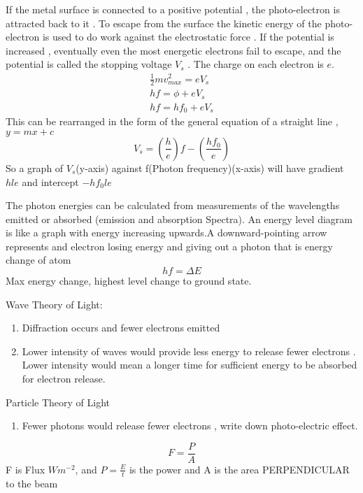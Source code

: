 \documentclass[a4paper]{article}
\begin{document}
\begin{defi}
If the metal surface is connected to a positive potential , the photo-electron is attracted back to it . To escape from the surface the kinetic energy of the photo-electron is used to do work against the electrostatic force . If the potential is increased , eventually even the most energetic electrons fail to escape, and the potential is called the stopping voltage $V_s$ . The charge on each electron is $e$.
\begin{align*}
    \frac{1}{2}mv^2_{max}=eV_s\\
    hf=\phi+eV_s\\
    hf=hf_0+eV_s
\end{align*}
This can be rearranged in the form of the general equation of a straight line , $y=mx+c$
\begin{equation*}
    V_s=(\frac{h}{e})f-(\frac{hf_0}{e})
\end{equation*}
So a graph of $V_s$(y-axis) against f(Photon frequency)(x-axis) will have gradient $hle$ and intercept $-hf_0le$
\end{defi}

\begin{defi}
The photon energies can be calculated from measurements of the wavelengths emitted or absorbed (emission and absorption Spectra). An energy level diagram is like a graph with energy increasing upwards.A downward-pointing arrow represents and electron losing energy and giving out a photon that is energy change of atom
\begin{equation*}
    hf=\Delta E
\end{equation*}
Max energy change, highest level change to ground state.
\end{defi}

\begin{defi}[Duality]
Wave Theory of Light:
\begin{enumerate}
    \item Diffraction occurs and fewer electrons emitted
    \item Lower intensity of waves would provide less energy to release fewer electrons . Lower intensity would mean a longer time for sufficient energy to be absorbed for electron release.
\end{enumerate}
Particle Theory of Light
\begin{enumerate}
    \item Fewer photons would release fewer electrons , write down photo-electric effect.
\end{enumerate}
\end{defi}
\begin{defi}
\begin{equation*}
    F=\frac{P}{A}
\end{equation*}
F is Flux $Wm^{-2}$, and $P=\frac{E}{t}$ is the power and A is the area PERPENDICULAR to the beam
\end{defi}
\end{document}
